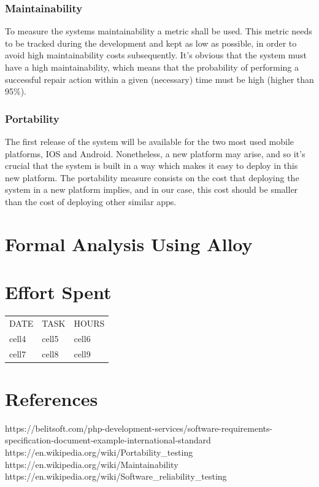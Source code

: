 \documentclass[12pt]{article}
\begin{document}
\subsubsection{Maintainability}
To measure the systems maintainability a metric shall be used. This metric needs to be tracked during the development and kept as low as possible, in order to avoid high maintainability costs subsequently. It's obvious that the system must have a high maintainability, which means that the probability of performing a successful repair action within a given (necessary) time must be high (higher than 95\%).

\subsubsection{Portability}
The first release of the system will be available for the two most used mobile platforms, IOS and Android. Nonetheless, a new platform may arise, and so it's crucial that the system is built in a way which makes it easy to deploy in this new platform. The portability measure consists on the cost that deploying the system in a new platform implies, and in our case, this cost should be smaller than the cost of deploying other similar apps.

\section{Formal Analysis Using Alloy}

\section{Effort Spent}

\begin{center}
\begin{tabular}{ |l|l|l| } 
 \hline
 DATE & TASK & HOURS \\ 
 cell4 & cell5 & cell6 \\ 
 cell7 & cell8 & cell9 \\ 
 \hline
\end{tabular}
\end{center}

\section{References}
https://belitsoft.com/php-development-services/software-requirements-specification-document-example-international-standard\\
https://en.wikipedia.org/wiki/Portability_testing\\
https://en.wikipedia.org/wiki/Maintainability\\
https://en.wikipedia.org/wiki/Software_reliability_testing
\end{document}
